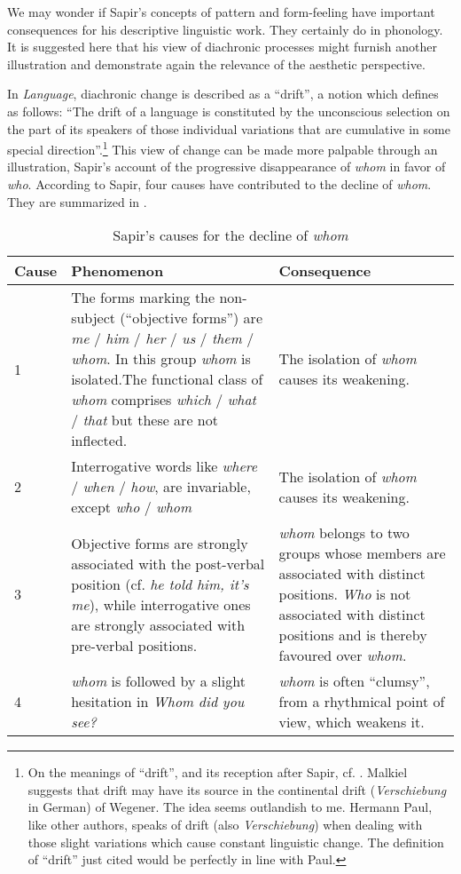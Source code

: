 \documentclass[output=paper]{langscibook}
\begin{document}
We may wonder if Sapir's concepts of pattern and form-feeling have important consequences for his descriptive linguistic work. They certainly do in phonology. It is suggested here that his view of diachronic processes might furnish another illustration and demonstrate again the relevance of the aesthetic perspective.

In \emph{Language}, diachronic change is described as a ``drift'', a notion which \citep[155]{Sapir1921} defines as follows: ``The drift of a language is constituted by the unconscious selection on the part of its speakers of those individual variations that are cumulative in some special direction''.\footnote{On the meanings of ``drift'', and its reception after Sapir, cf. \citet{Malkiel1981}. Malkiel suggests that drift may have its source in the continental drift (\emph{Verschiebung} in German) of Wegener. The idea seems outlandish to me. Hermann Paul, like other authors, speaks of drift (also \emph{Verschiebung}) when dealing with those slight variations which cause constant linguistic change. The definition of ``drift'' just cited would be perfectly in line with Paul.} This view of change can be made more palpable through an illustration, Sapir's account of the progressive disappearance of \emph{whom} in favor of \emph{who}. According to Sapir, four causes have contributed to the decline of \emph{whom}. They are summarized in .

\begin{table}
\begin{tabular}{p{2cm} p{4.25cm} p{4.25cm}}
\textbf{Cause} & \textbf{Phenomenon} & \textbf{Consequence} \\
\midrule
1 & The forms marking the non-subject (``objective forms'') are \emph{me} / \emph{him} / \emph{her} / \emph{us} / \emph{them} / \emph{whom}. In this group \emph{whom} is isolated.\newline The functional class of \emph{whom} comprises \emph{which} / \emph{what} / \emph{that} but these are not inflected.
& The isolation of \emph{whom} causes its weakening. \\
\midrule
2 & Interrogative words like \emph{where} / \emph{when} / \emph{how}, are invariable, except \emph{who} / \emph{whom} & The isolation of \emph{whom} causes its weakening. \\
\midrule
3 & Objective forms are strongly associated with the post-verbal position (cf. \emph{he told him, it's me}), while interrogative ones are strongly associated with pre-verbal positions. & \emph{whom} belongs to two groups whose members are associated with distinct positions. \emph{Who} is not associated with distinct positions and is thereby favoured over \emph{whom}. \\
\midrule
4 & \emph{whom} is followed by a slight hesitation in \emph{Whom did you see?} & \emph{whom} is often ``clumsy'', from a rhythmical point of view, which weakens it.
\end{tabular}
\caption{Sapir's causes for the decline of \emph{whom}}
\label{tab:fortis:causes}
\end{table}
\end{document}
